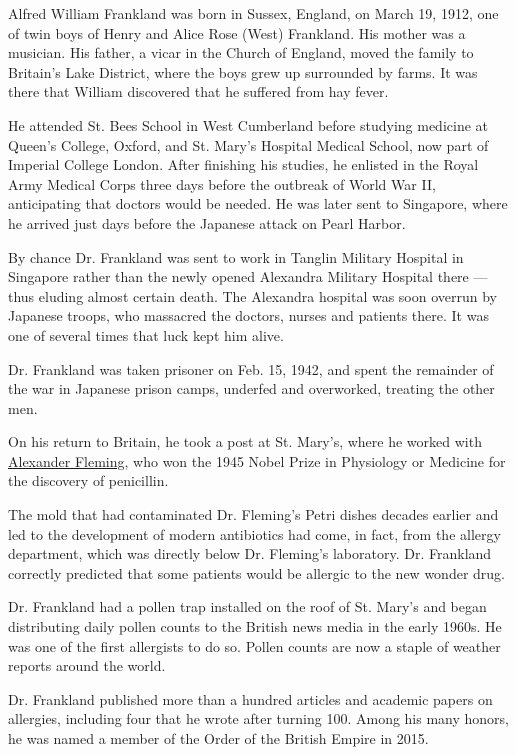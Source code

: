Alfred William Frankland was born in Sussex, England, on March 19, 1912,
one of twin boys of Henry and Alice Rose (West) Frankland. His mother
was a musician. His father, a vicar in the Church of England, moved the
family to Britain's Lake District, where the boys grew up surrounded by
farms. It was there that William discovered that he suffered from hay
fever.

He attended St. Bees School in West Cumberland before studying medicine
at Queen's College, Oxford, and St. Mary's Hospital Medical School, now
part of Imperial College London. After finishing his studies, he
enlisted in the Royal Army Medical Corps three days before the outbreak
of World War II, anticipating that doctors would be needed. He was later
sent to Singapore, where he arrived just days before the Japanese attack
on Pearl Harbor.

By chance Dr. Frankland was sent to work in Tanglin Military Hospital in
Singapore rather than the newly opened Alexandra Military Hospital there
--- thus eluding almost certain death. The Alexandra hospital was soon
overrun by Japanese troops, who massacred the doctors, nurses and
patients there. It was one of several times that luck kept him alive.

Dr. Frankland was taken prisoner on Feb. 15, 1942, and spent the
remainder of the war in Japanese prison camps, underfed and overworked,
treating the other men.

On his return to Britain, he took a post at St. Mary's, where he worked
with
\href{https://www.nytimes.com/1955/03/12/archives/sir-alexander-fleming.html}{Alexander
Fleming}, who won the 1945 Nobel Prize in Physiology or Medicine for the
discovery of penicillin.

The mold that had contaminated Dr. Fleming's Petri dishes decades
earlier and led to the development of modern antibiotics had come, in
fact, from the allergy department, which was directly below Dr.
Fleming's laboratory. Dr. Frankland correctly predicted that some
patients would be allergic to the new wonder drug.

Dr. Frankland had a pollen trap installed on the roof of St. Mary's and
began distributing daily pollen counts to the British news media in the
early 1960s. He was one of the first allergists to do so. Pollen counts
are now a staple of weather reports around the world.

Dr. Frankland published more than a hundred articles and academic papers
on allergies, including four that he wrote after turning 100. Among his
many honors, he was named a member of the Order of the British Empire in
2015.

